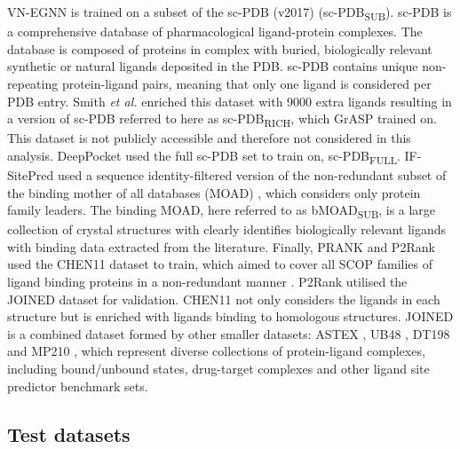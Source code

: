 VN-EGNN is trained on a subset \cite{KANDEL_2021_PURESNET} of the sc-PDB (v2017) \cite{PAUL_2004_SCPDB, KELLENBERGER_2006_SCPDB, MESLAMANI_2011_SCPDB, DESAPHY_2015_SCPDB} (sc-PDB\textsubscript{SUB}). sc-PDB is a comprehensive database of pharmacological ligand-protein complexes. The database is composed of proteins in complex with buried, biologically relevant synthetic or natural ligands deposited in the PDB. sc-PDB contains unique non-repeating protein-ligand pairs, meaning that only one ligand is considered per PDB entry. Smith \textit{et al.} \cite{SMITH_2024_GrASP} enriched this dataset with 9000 extra ligands resulting in a version of sc-PDB referred to here as sc-PDB\textsubscript{RICH}, which GrASP trained on. This dataset is not publicly accessible and therefore not considered in this analysis. DeepPocket used the full sc-PDB set to train on, sc-PDB\textsubscript{FULL}. IF-SitePred used a sequence identity-filtered version of the non-redundant subset of the binding mother of all databases (MOAD) \cite{HU_2005_BMOAD, BENSON_2008_BMOAD, AHMED_2015_BMOAD, SMITH_2019_BMOAD}, which considers only protein family leaders. The binding MOAD, here referred to as bMOAD\textsubscript{SUB}, is a large collection of crystal structures with clearly identifies biologically relevant ligands with binding data extracted from the literature. Finally, PRANK and P2Rank used the CHEN11 dataset to train, which aimed to cover all SCOP \cite{HUBBARD_1997_SCOP, HUBBARD_1998_SCOP, LOCONTE_2000_SCOP} families of ligand binding proteins in a non-redundant manner \cite{CHEN_2011_ASSESSMENT}. P2Rank utilised the JOINED dataset for validation. CHEN11 not only considers the ligands in each structure but is enriched with ligands binding to homologous structures. JOINED is a combined dataset formed by other smaller datasets: ASTEX \cite{HARTSHORN_2007_ASTEX}, UB48 \cite{HUANG_2006_BU48}, DT198 \cite{ZHANG_2011_METAPOCKET} and MP210 \cite{HUANG_2009_METAPOCKET}, which represent diverse collections of protein-ligand complexes, including bound/unbound states, drug-target complexes and other ligand site predictor benchmark sets.

\subsection{Test datasets}

